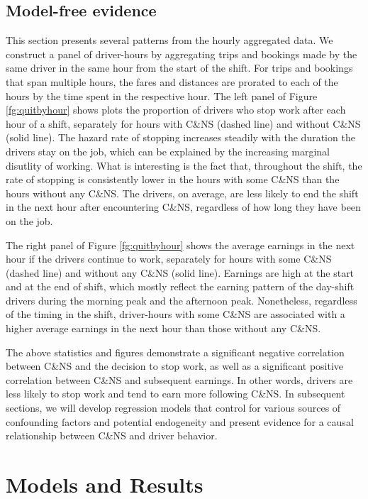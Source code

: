 \documentclass[reviewmode,AEJ]{AEA}
\begin{document}
\subsection{Model-free evidence}
This section presents several patterns from the hourly aggregated data. We construct a panel of driver-hours by aggregating trips and bookings made by the same driver in the same hour from the start of the shift. For trips and bookings that span multiple hours, the fares and distances are prorated to each of the hours by the time spent in the respective hour. 
The left panel of Figure \ref{fg:quitbyhour}
shows plots the proportion of drivers who stop work after each hour of a shift, separately for
hours with C\&NS (dashed line) and without C\&NS (solid line).
The hazard rate of stopping increases steadily with the duration the drivers stay on the job, which can be explained by the increasing marginal disutlity of working. 
What is interesting is the fact that, throughout the shift, the rate of stopping is consistently lower in the hours with some C\&NS than the hours without any C\&NS. The drivers, on average, are less likely to end the shift in the next hour after encountering C\&NS, regardless of how long they have been on the job.

The right panel of Figure \ref{fg:quitbyhour} shows the average earnings in the next hour if the drivers continue to work, separately for hours with some C\&NS (dashed line) and without any C\&NS (solid line).
Earnings are high at the start and at the end of shift, which mostly reflect the earning pattern of the day-shift drivers during the morning peak and the afternoon peak. Nonetheless, regardless of the timing in the shift, driver-hours with some C\&NS are associated with a higher average earnings in the next hour than those without any C\&NS.


The above statistics and figures demonstrate a significant negative correlation between C\&NS and the 
decision to stop work, as well as a significant positive correlation between C\&NS and subsequent earnings.
In other words, drivers are less likely to stop work and tend to earn more following C\&NS. In subsequent
sections, we will develop regression models  that control for various sources of confounding factors and
potential endogeneity and present evidence for a causal relationship between C\&NS and driver behavior.

\section{Models and Results}
\label{sec:main}
\end{document}
